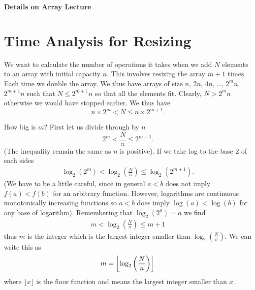 \documentclass{article}
\begin{document}
\begin{center}
  \Large \bf Details on Array Lecture
\end{center}

\section*{Time Analysis for Resizing}

We want to calculate the number of operations it takes when we add $N$
elements to an array with initial capacity $n$.  This involves resizing
the array $m+1$ times. Each time we double the array.  We thus have arrays
of size $n$, $2n$, $4n$, \ldots, $2^m n$, $2^{m+1}n$ such that $N\leq
2^{m+1}n$ so that all the elements fit.  Clearly, $N>2^{m}n$ otherwise
we would have stopped earlier.  We thus have
\begin{displaymath}
  n\times 2^m < N \leq n \times 2^{m+1}.
\end{displaymath}

How big is $m$?  First let us divide through by $n$
\begin{displaymath}
  2^m < \frac{N}{n} \leq 2^{m+1}.
\end{displaymath}
(The inequality remain the same as $n$ is positive).
If we take log to the base 2 of each sides
\begin{align*}
  \log_2\left( 2^m\right) < \log_2(\frac{N}{n}) 
  \leq \log_2\left(2^{m+1}\right).
\end{align*}
(We have to be a little careful, since in general $a<b$ does not imply
$f(a)<f(b)$ for an arbitrary function.  However, logarithms are
continuous monotonically increasing functions so $a<b$ does imply
$\log(a)<\log(b)$ for any base of logarithm).  Remembering
that $\log_2(2^a) = a$ we find
\begin{align*}
  m < \log_2(\frac{N}{n}) \leq m+1
\end{align*}
thus $m$ is the integer which is the largest integer smaller than
$\log_2(\frac{N}{n})$.  We can write this as
\begin{align*}
  m = \left\lfloor \log_2\left(\strut \frac{N}{n} \right) \right\rfloor
\end{align*}
where $\lfloor x \rfloor$ is the floor function and means the largest
integer smaller than $x$.
\end{document}
